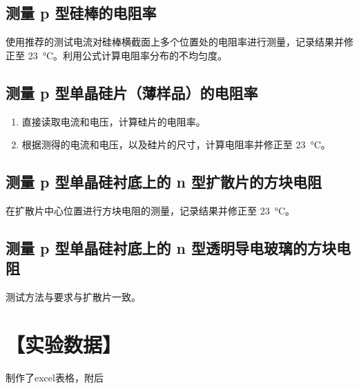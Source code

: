 \documentclass[a4paper,utf8]{article}
\begin{document}
    \subsection*{测量 p 型硅棒的电阻率}
    使用推荐的测试电流对硅棒横截面上多个位置处的电阻率进行测量，记录结果并修正至 \SI{23}{\degreeCelsius}。利用公式计算电阻率分布的不均匀度。
    
    \subsection*{测量 p 型单晶硅片（薄样品）的电阻率}
    \begin{enumerate}
        \item 直接读取电流和电压，计算硅片的电阻率。
        \item 根据测得的电流和电压，以及硅片的尺寸，计算电阻率并修正至 \SI{23}{\degreeCelsius}。
    \end{enumerate}
    
    \subsection*{测量 p 型单晶硅衬底上的 n 型扩散片的方块电阻}
    在扩散片中心位置进行方块电阻的测量，记录结果并修正至 \SI{23}{\degreeCelsius}。
    
    \subsection*{测量 p 型单晶硅衬底上的 n 型透明导电玻璃的方块电阻}
    测试方法与要求与扩散片一致。

\section*{【实验数据】}
    制作了excel表格，附后
    \begin{figure}[!ht]
        \begin{floatrow}
        \end{floatrow}
    
    \end{figure}
\end{document}
